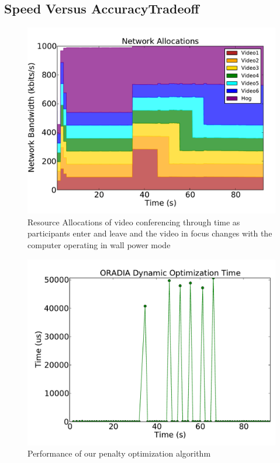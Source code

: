 \subsection*{Speed Versus AccuracyTradeoff}

\begin{figure}[!t]
	\begin{center}	
		\includegraphics[bb=0 0 576 432,width=\columnwidth]{dyn-alloc-wp-ns-40ms.pdf}
		\caption{Resource Allocations of video conferencing through time as participants enter and leave and the video in focus changes with the computer operating in wall power mode}
		\label{video_experiment_wp_40ms}
	\end{center}
\end{figure}

\begin{figure}[!t]
	\begin{center}	
		\includegraphics[bb=0 0 576 432,width=\columnwidth]{opt_time-40ms.pdf}
		\caption{Performance of our penalty optimization algorithm}
		\label{optimization_perf_40ms}
	\end{center}
\end{figure}


